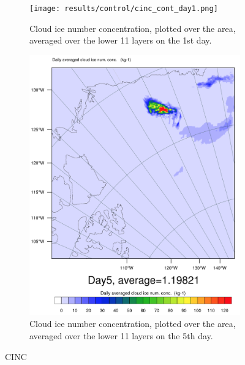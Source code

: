 \begin{figure}
	\begin{subfigure}{0.48\textwidth}
		\centering
		\texttt{[image: results/control/cinc\_cont\_day1.png]}
		\caption{Cloud ice number concentration, plotted over the area, averaged over the lower 11 layers on the 1st day.}
		\label{subfig:cinc_cont_Day1}
	\end{subfigure}
	\begin{subfigure}{0.48\textwidth}
		\centering
		\includegraphics[width=\textwidth]{results/control/cinc_cont_day5.png}
		\caption{Cloud ice number concentration, plotted over the area, averaged over the lower 11 layers on the 5th day.}
		\label{subfig:cinc_cont_Day5}
	\end{subfigure}
	\caption{CINC}
	\label{fig:cloudice}
\end{figure}

